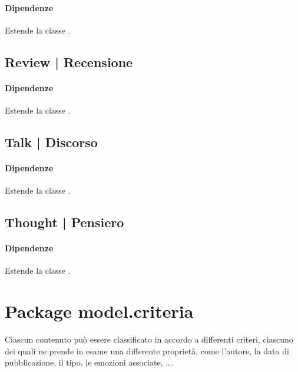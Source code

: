 \documentclass[10pt,a4paper,headinclude,footinclude,hidelinks]{scrreprt} %
\begin{document}
	\paragraph{Dipendenze} Estende la classe \textit{}.

	\subsection[Review]{Review | Recensione}
	\label{sec:stage:design:sistema:model.content:review}

	\paragraph{Dipendenze} Estende la classe \textit{}.

	\subsection[Talk]{Talk | Discorso}
	\label{sec:stage:design:sistema:model.content:talk}

	\paragraph{Dipendenze} Estende la classe \textit{}.

	\subsection[Thought]{Thought | Pensiero}
	\label{sec:stage:design:sistema:model.content:thought}
	
	\paragraph{Dipendenze} Estende la classe \textit{}.

	\section{Package model.criteria}
	\label{sec:stage:design:sistema:model.criteria}
	Ciascun contenuto può essere classificato in accordo a differenti criteri, ciascuno dei quali ne prende in esame una differente proprietà, come l'autore, la data di pubblicazione, il tipo, le emozioni associate, \ldots .
\end{document}
